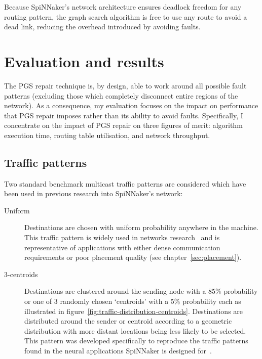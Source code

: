 		Because SpiNNaker's network architecture ensures deadlock freedom for any
		routing pattern, the graph search algorithm is free to use any route to
		avoid a dead link, reducing the overhead introduced by avoiding faults.
		
	\section{Evaluation and results}
		
		\label{sec:routing-evaluation}
		
		The PGS repair technique is, by design, able to work around all possible
		fault patterns (excluding those which completely disconnect entire regions
		of the network). As a consequence, my evaluation focuses on the impact on
		performance that PGS repair imposes rather than its ability to avoid
		faults.  Specifically, I concentrate on the impact of PGS repair on three
		figures of merit: algorithm execution time, routing table utilisation, and
		network throughput.
		
		\subsection{Traffic patterns}
			
			Two standard benchmark multicast traffic patterns are considered which
			have been used in previous research into SpiNNaker's network:
			
			\begin{description}
				
				\item[Uniform] Destinations are chosen with uniform probability
				anywhere in the machine. This traffic pattern is widely used in
				networks research~\cite[chapter~23]{dally04} and is representative of
				applications with either dense communication requirements or poor
				placement quality (see chapter~\ref{sec:placement}).
				
				\item[3-centroids] Destinations are clustered around the sending node
				with a 85\% probability or one of 3 randomly chosen `centroids' with a
				5\% probability each as illustrated in
				figure~\ref{fig:traffic-distribution-centroids}.  Destinations are
				distributed around the sender or centroid according to a geometric
				distribution with more distant locations being less likely to be
				selected.  This pattern was developed specifically to reproduce the
				traffic patterns found in the neural applications SpiNNaker is designed
				for~\cite{navaridas14}.
				
			\end{description}
			
